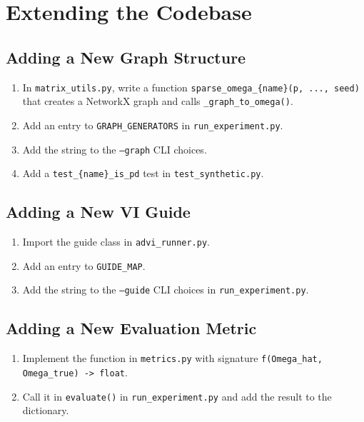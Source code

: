 \documentclass[11pt,a4paper]{article}
\begin{document}
\section{Extending the Codebase}

\subsection{Adding a New Graph Structure}

\begin{enumerate}[nosep]
  \item In \texttt{matrix\_utils.py}, write a function \texttt{sparse\_omega\_\{name\}(p, ..., seed)} that creates a NetworkX graph and calls \texttt{\_graph\_to\_omega()}.
  \item Add an entry to \texttt{GRAPH\_GENERATORS} in \texttt{run\_experiment.py}.
  \item Add the string to the \texttt{--graph} CLI choices.
  \item Add a \texttt{test\_\{name\}\_is\_pd} test in \texttt{test\_synthetic.py}.
\end{enumerate}

\subsection{Adding a New VI Guide}

\begin{enumerate}[nosep]
  \item Import the guide class in \texttt{advi\_runner.py}.
  \item Add an entry to \texttt{GUIDE\_MAP}.
  \item Add the string to the \texttt{--guide} CLI choices in \texttt{run\_experiment.py}.
\end{enumerate}

\subsection{Adding a New Evaluation Metric}

\begin{enumerate}[nosep]
  \item Implement the function in \texttt{metrics.py} with signature \texttt{f(Omega\_hat, Omega\_true) -> float}.
  \item Call it in \texttt{evaluate()} in \texttt{run\_experiment.py} and add the result to the dictionary.
\end{enumerate}
\end{document}
